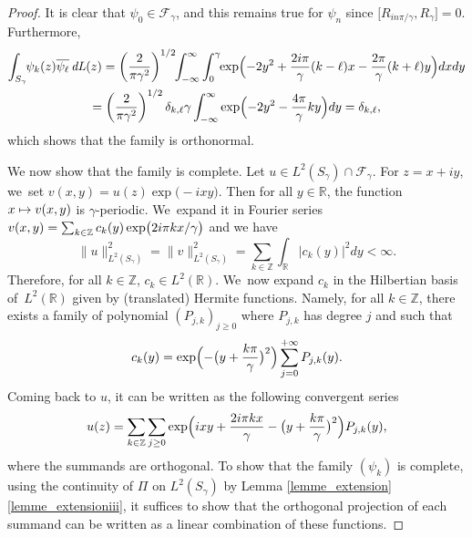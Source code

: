 \documentclass[JEP,XML,SOM,Unicode,NoFloatCountersInSection,published]{cedram}
\newcommand\mto{\mathchoice{\longmapsto}{\mapsto}{\mapsto}{\mapsto}}
\DeclareMathOperator{\dL}{\mathit{dL}}
\theoremstyle{definition}
\let\EE\exp
\let\dis\relax
\let\ov\overline
\newcommand\R{\mathbb R}
\newcommand\Z{\mathbb Z}
\begin{document}
\begin{proof} It is clear that $\psi_0 \in \mathcal{F}_\gamma$, and this remains true for $\psi_n$ since $\big[R_{{i n \pi}/\gamma},R_\gamma\big] = 0$. Furthermore,
\begin{multline*}
\int_{S_{\gamma}}\hspace*{-1mm} \psi_{k}(z)\ov{\psi_{\ell}} \dL(z) =\left(\frac{2}{\pi \gamma^2}\right)^{1/2}\hspace*{-1mm}
\int_{-\infty}^\infty \int_0^\gamma \hspace*{-1mm}\EE\Bigl(-2y^2+\frac{2i\pi}{\gamma}(k-\ell)x-\frac{2\pi}{\gamma}(k+\ell)y\Bigr) dx dy \\
= \left(\frac{2}{\pi \gamma^2}\right)^{1/2} \delta_{k,\ell} \gamma \int_{-\infty}^\infty \EE\Bigl(-2y^2-\frac{4\pi}{\gamma}ky\Bigr) dy = \delta_{k,\ell},
\end{multline*}
which shows that the family is orthonormal. 

We now show that the family is complete. Let $u \in L^2(S_\gamma) \cap \mathcal{F}_\gamma$. For $z=x+iy$, we~set $v(x,y)=u(z)\EE\bigl(-ixy\bigr)$. Then for all $y \in \R$, the function $x \mto v(x,y)$ is $\gamma$-periodic. We~expand it in Fourier series $\dis v(x,y)=\sum_{k \in \Z} c_k(y)\EE\bigl({{2i \pi k x}/\gamma}\bigr)$ and we have
\[
\|u \|^2_{L^2(S_\gamma)}=\|v\|^2_{L^2(S_\gamma)}=\sum_{k \in \Z} \int_{\R}|c_k(y)|^2 dy <\infty. 
\]
Therefore, for all $k \in \Z$, $c_k \in L^2(\R)$. We~now expand $c_k$ in the Hilbertian basis of~$L^2(\R)$ given by (translated) Hermite functions. Namely, for all $k\in \Z$, there exists a family of polynomial $(P_{j,k})_{j \geq 0}$ where $P_{j,k}$ has degree $j$ and such that
\[
c_k(y)=\EE\Bigl(-\bigl(y+\frac{k \pi}\gamma\bigr)^2\Bigr)\sum_{j=0}^{+\infty}P_{j,k}(y).
\]
Coming back to $u$, it can be written as the following convergent series
\[
u(z)=\sum_{k \in \Z} \sum_{j\geq 0} \EE\Bigl({ixy+\frac{2i \pi k x}\gamma -\bigl(y+\frac{k \pi}\gamma\bigr)^2} \Bigr) P_{j,k}(y),
\]
where the summands are orthogonal. To show that the family $(\psi_k)$ is complete, using the continuity of $\Pi$ on $L^2(S_\gamma)$ by Lemma \ref{lemme_extension}\eqref{lemme_extensioniii}, it suffices to show that the orthogonal projection of each summand can be written as a linear combination of these functions.


\end{proof}
\end{document}
